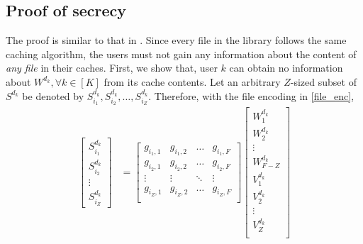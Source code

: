 \documentclass[conference]{IEEEtran}
\begin{document}
\subsection{Proof of secrecy}  The proof is similar to that in \cite{SecretiveCollud}. Since every file in the library follows the same caching algorithm, the users must not gain any information about the content of \emph{any file} in their caches. First, we show that, user $k$ can obtain no information about $W^{d_k},\forall k\in[K]$ from its cache contents. Let an arbitrary $Z$-sized subset of $S^{d_k}$ be denoted by $S^{d_k}_{i_1},S^{d_k}_{i_2},\ldots,S^{d_k}_{i_Z}$. Therefore, with the file encoding in \eqref{file_enc},
	\begin{align}
	\begin{bmatrix}
	S^{d_k}_{i_1}\\S^{d_k}_{i_2}\\ \vdots\\S^{d_k}_{i_Z}
	\end{bmatrix}
	&=
	\begin{bmatrix}
	g_{i_1,1}&g_{i_1,2}&\ldots&g_{i_1,F}\\
	g_{i_2,1}&g_{i_2,2}&\ldots&g_{i_2,F}\\
	\vdots& \vdots & \ddots & \vdots\\
	g_{i_Z,1}&g_{i_Z,2}&\ldots&g_{i_Z,F}\\
	\end{bmatrix}
	\begin{bmatrix}
	W^{d_k}_1\\
	W^{d_k}_2\\
	\vdots\\
	W^{d_k}_{F-Z}\\
	V^{d_k}_1\\
	V^{d_k}_2\\
	\vdots\\
	V^{d_k}_Z\\
	\end{bmatrix}
	\end{align}
\end{document}
